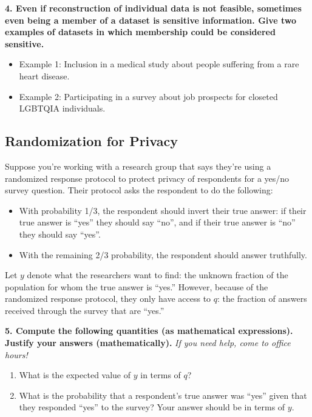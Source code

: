 \documentclass{article}
\begin{document}
\textbf{4. Even if reconstruction of individual data is not feasible, sometimes even being a member of a dataset is sensitive information. Give two examples of datasets in which membership could be considered sensitive.}
\bigskip
\begin{mdframed}
\begin{itemize}
\item Example 1: Inclusion in a medical study about people suffering from a rare heart disease.
\item Example 2: Participating in a survey about job prospects for closeted LGBTQIA individuals.
\end{itemize}
\end{mdframed}
\bigskip


\subsection*{Randomization for Privacy}

Suppose you’re working with a research group that says they’re using a randomized response protocol to protect privacy of respondents for a yes/no survey question. Their protocol asks the respondent to do the following:
\begin{itemize}
\item With probability 1/3, the respondent should invert their true answer: if their true answer is ``yes'' they should say ``no'', and if their true answer is ``no'' they should say ``yes''.
\item With the remaining 2/3 probability, the respondent should answer truthfully.
\end{itemize}
Let $y$ denote what the researchers want to find: the unknown fraction of the population for whom the true answer is ``yes.'' However, because of the randomized response protocol, they only have access to $q$: the fraction of answers received through the survey that are ``yes.''

\textbf{5. Compute the following quantities (as mathematical expressions). Justify your answers (mathematically).} \textit{If you need help, come to office hours!}
\begin{enumerate}[label=\Alph*.]
\item What is the expected value of $y$ in terms of $q$?
\item What is the probability that a respondent's true answer was ``yes'' given that they responded ``yes'' to the survey? Your answer should be in terms of $y$.
\end{enumerate}
\end{document}

